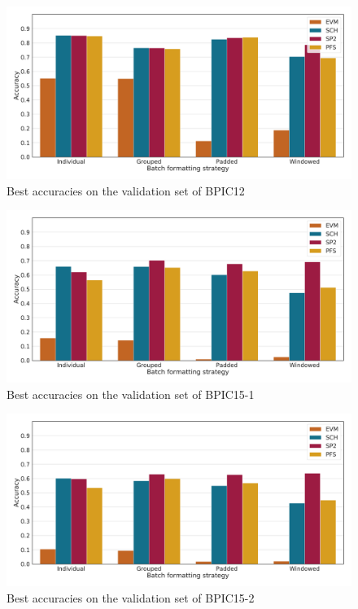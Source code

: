 \begin{figure}
    \centering
    \includegraphics[width=\textwidth]{gfx/bpic2012/accuracies.pdf}
    \caption{Best accuracies on the validation set of BPIC12}
    \label{fig:max-accuracies-bpic2012}
\end{figure}
\begin{figure}
    \centering
    \includegraphics[width=\textwidth]{gfx/bpic2015_1/accuracies.pdf}
    \caption{Best accuracies on the validation set of BPIC15-1}
    \label{fig:max-accuracies-bpic2015-1}
\end{figure}
\begin{figure}
    \centering
    \includegraphics[width=\textwidth]{gfx/bpic2015_2/accuracies.pdf}
    \caption{Best accuracies on the validation set of BPIC15-2}
    \label{fig:max-accuracies-bpic2015-2}
\end{figure}
